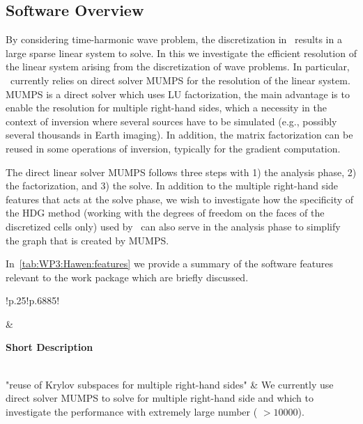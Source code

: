\subsection{Software Overview}
\label{sec:WP3:Hawen:summary}

By considering time-harmonic wave problem, the discretization in 
\hawen~results in a large sparse linear system to solve. In this
we investigate the efficient resolution of the linear system arising
from the discretization of wave problems. In particular, \hawen~currently
relies on direct solver MUMPS for the resolution of the linear system.
MUMPS is a direct solver which uses LU factorization, the main advantage
is to enable the resolution for multiple right-hand sides, which a 
necessity in the context of inversion where several sources have to 
be simulated (e.g., possibly several thousands in Earth imaging). 
In addition, the matrix factorization can be reused in some operations
of inversion, typically for the gradient computation.

The direct linear solver MUMPS follows three steps with 1) the 
analysis phase, 2) the factorization, and 3) the solve. 
In addition to the multiple right-hand side features that acts 
at the solve phase, we wish to investigate how the specificity 
of the HDG method 
(working with the degrees of freedom on the faces of the discretized cells only)
used by \hawen~can also serve in the analysis phase to simplify 
the graph that is created by MUMPS.


In~\cref{tab:WP3:Hawen:features} we provide a summary of the software 
features relevant to the work package which are briefly discussed.

\begin{table}[h!]
    \centering
    { 
        \setlength{\parindent}{0pt}
        \def\arraystretch{1.25}
        {
            \fontsize{9}{11}\selectfont
            \begin{tabular}{!{\color{numpexgray}\vrule}p{.25\linewidth}!{\color{numpexgray}\vrule}p{.6885\linewidth}!{\color{numpexgray}\vrule}}
    
     &  {\rule{0pt}{2.5ex}\color{white}\bf Short Description }\\ 
    
    "reuse of Krylov subspaces for multiple right-hand sides" & 
We currently use direct solver MUMPS to solve for multiple right-hand side and 
which to investigate the performance with extremely large number ( $>\num{10000}$). \\
\end{tabular}
        }
    }
    \caption{WP3: Hawen Features}
    \label{tab:WP3:Hawen:features}
\end{table}


